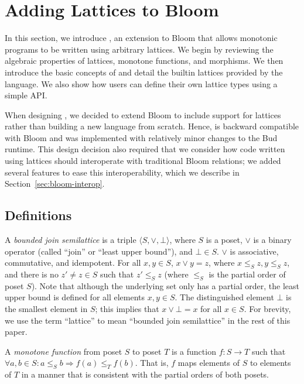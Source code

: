 \section{Adding Lattices to Bloom}
\label{sec:lang}

In this section, we introduce \lang, an extension to Bloom that allows monotonic
programs to be written using arbitrary lattices. We begin by reviewing the
algebraic properties of lattices, monotone functions, and morphisms. We then
introduce the basic concepts of \lang and detail the builtin lattices provided
by the language. We also show how users can define their own lattice types using
a simple API.

When designing \lang, we decided to extend Bloom to include support for lattices
rather than building a new language from scratch. Hence, \lang is backward
compatible with Bloom and was implemented with relatively minor changes to the
Bud runtime. This design decision also required that we consider how code
written using lattices should interoperate with traditional Bloom relations; we
added several \lang features to ease this interoperability, which we describe in
Section~\ref{sec:bloom-interop}.

\subsection{Definitions}
\label{sec:lattice-defn}
A \emph{bounded join semilattice} is a triple $\langle S, \lor, \bot\rangle$,
where $S$ is a poset, $\lor$ is a binary operator (called ``join'' or ``least
upper bound''), and $\bot \in S$. $\lor$ is associative, commutative, and
idempotent. For all $x, y \in S$, $x \lor y = z$, where $x \leq_S z, y \leq_S
z$, and there is no $z' \ne z \in S$ such that $z' \leq_S z$ (where $\leq_S$ is
the partial order of poset $S$). Note that although the underlying set only has
a partial order, the least upper bound is defined for all elements $x,y \in
S$. The distinguished element $\bot$ is the smallest element in $S$; this
implies that $x \lor \bot = x$ for all $x \in S$. For brevity, we use the term
``lattice'' to mean ``bounded join semilattice'' in the rest of this paper.

A \emph{monotone function} from poset $S$ to poset $T$ is a function $f: S \to
T$ such that $\forall a,b \in S: a \leq_S b \Rightarrow f(a) \leq_T f(b)$. That
is, $f$ maps elements of $S$ to elements of $T$ in a manner that is consistent
with the partial orders of both posets.

